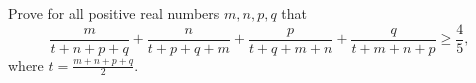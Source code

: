Prove for all positive real numbers $m,n,p,q$ that$$\frac{m}{t+n+p+q} + \frac{n}{t+p+q+m} + \frac{p}{t+q+m+n} + \frac{q}{t+m+n+p} \geq \frac{4}{5},$$where $t=\frac{m+n+p+q}{2}.$